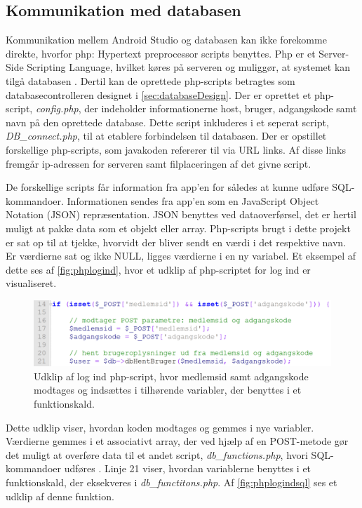 \subsection{Kommunikation med databasen}
Kommunikation mellem Android Studio og databasen kan ikke forekomme direkte, hvorfor php: Hypertext preprocessor scripts benyttes. Php er et Server-Side Scripting Language, hvilket køres på serveren og muliggør, at systemet kan tilgå databasen \cite{silbershatz2011}. Dertil kan de oprettede php-scripts betragtes som databasecontrolleren designet i \autoref{sec:databaseDesign}.
Der er oprettet et php-script, \textit{config.php}, der indeholder informationerne host, bruger, adgangskode samt navn på den oprettede database. Dette script inkluderes i et seperat script, \textit{DB\_connect.php}, til at etablere forbindelsen til databasen. Der er opstillet forskellige php-scripts, som javakoden refererer til via URL links. Af disse links fremgår ip-adressen for serveren samt filplaceringen af det givne script. 

De forskellige scripts får information fra app'en for således at kunne udføre SQL-kommandoer. Informationen sendes fra app'en som en JavaScript Object Notation (JSON) repræsentation. JSON benyttes ved dataoverførsel, det er hertil muligt at pakke data som et objekt eller array.\cite{silbershatz2011} Php-scripts brugt i dette projekt er sat op til at tjekke, hvorvidt der bliver sendt en værdi i det respektive navn. Er værdierne sat og ikke NULL, ligges værdierne i en ny variabel. Et eksempel af dette ses af \autoref{fig:phplogind}, hvor et udklip af php-scriptet for log ind er visualiseret. 

\begin{figure} [H]
\centering
\includegraphics[width=1\textwidth]{figures/imple/phplogind}
\caption{Udklip af log ind php-script, hvor medlemsid samt adgangskode modtages og indsættes i tilhørende variabler, der benyttes i et funktionskald.}
\label{fig:phplogind}
\end{figure}

\noindent
Dette udklip viser, hvordan koden modtages og gemmes i nye variabler. Værdierne gemmes i et associativt array, der ved hjælp af en POST-metode gør det muligt at overføre data til et andet script, \textit{db\_functions.php}, hvori SQL-kommandoer udføres \cite{w3schools2017}. Linje 21 viser, hvordan variablerne benyttes i et funktionskald, der eksekveres i \textit{db\_functitons.php}. Af \autoref{fig:phplogindsql} ses et udklip af denne funktion.

